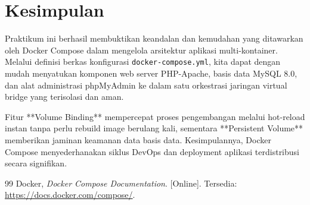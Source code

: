 \documentclass[a4paper,oneside,12pt]{report}
\renewcommand{\bibname}{Daftar Pustaka}
\begin{document}
\clearpage

\chapter{Kesimpulan}
Praktikum ini berhasil membuktikan keandalan dan kemudahan yang ditawarkan oleh Docker Compose dalam mengelola arsitektur aplikasi multi-kontainer. Melalui definisi berkas konfigurasi \texttt{docker-compose.yml}, kita dapat dengan mudah menyatukan komponen web server PHP-Apache, basis data MySQL 8.0, dan alat administrasi phpMyAdmin ke dalam satu orkestrasi jaringan virtual bridge yang terisolasi dan aman. 

Fitur **Volume Binding** mempercepat proses pengembangan melalui hot-reload instan tanpa perlu rebuild image berulang kali, sementara **Persistent Volume** memberikan jaminan keamanan data basis data. Kesimpulannya, Docker Compose menyederhanakan siklus DevOps dan deployment aplikasi terdistribusi secara signifikan.

\clearpage
{}
\renewcommand{\bibname}{Daftar Pustaka}
\begin{thebibliography}{99}
     Docker, \textit{Docker Compose Documentation}. [Online]. Tersedia: \url{https://docs.docker.com/compose/}.
\end{thebibliography}
\end{document}
